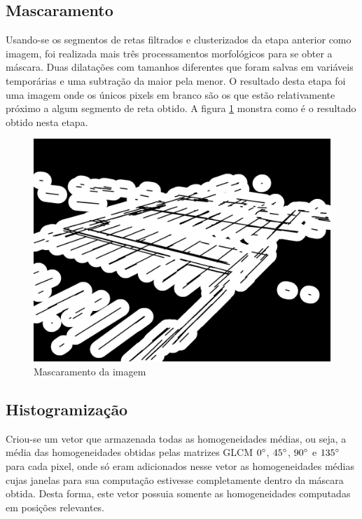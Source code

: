 \documentclass[10pt,twocolumn,letterpaper]{article}
\begin{document}
\subsection{Mascaramento}

	Usando-se os segmentos de retas filtrados e clusterizados da etapa anterior como imagem,
foi realizada mais três processamentos morfológicos para se obter a máscara. Duas dilatações
com tamanhos diferentes que foram salvas em variáveis temporárias e uma subtração da maior
pela menor. O resultado desta etapa foi uma imagem onde os únicos pixels em branco são os
que estão relativamente próximo a algum segmento de reta obtido. A figura \ref{fig:mask} monstra
como é o resultado obtido nesta etapa.

\begin{figure}[!hbp]
\centering
\includegraphics[width=\columnwidth]{area-checagem.jpg}
 \caption{Mascaramento da imagem}
\label{fig:mask}
\end{figure}

\subsection{Histogramização}

	Criou-se um vetor que armazenada todas as homogeneidades médias, ou seja, a média
das homogeneidades obtidas pelas matrizes GLCM $0\degree$, $45\degree$, $90\degree$ e
$135\degree$ para cada pixel, onde só eram adicionados nesse vetor as homogeneidades
médias cujas janelas para sua computação estivesse completamente dentro da máscara obtida.
Desta forma, este vetor possuia somente as homogeneidades computadas em posições relevantes.
\end{document}
